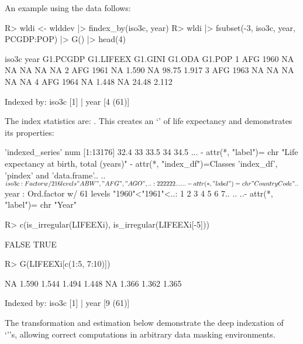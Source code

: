 \documentclass[article]{jss}
\newcommand{\class}[1]{`\code{#1}'}
\begin{document}
%
An example using the  data follows:
\begin{Schunk}
\begin{Sinput}
R> wldi <- wlddev |> findex_by(iso3c, year)
R> wldi |> fsubset(-3, iso3c, year, PCGDP:POP) |> G() |> head(4)
\end{Sinput}
\begin{Soutput}
  iso3c year G1.PCGDP G1.LIFEEX G1.GINI G1.ODA G1.POP
1   AFG 1960       NA        NA      NA     NA     NA
2   AFG 1961       NA     1.590      NA  98.75  1.917
3   AFG 1963       NA        NA      NA     NA     NA
4   AFG 1964       NA     1.448      NA  24.48  2.112

Indexed by:  iso3c [1] | year [4 (61)] 
\end{Soutput}
\end{Schunk}
The index statistics are: . This creates an \class{indexes\_series} of life expectancy and demonstrates its properties:
\begin{Schunk}
\begin{Soutput}
 'indexed_series' num [1:13176] 32.4 33 33.5 34 34.5 ...
 - attr(*, "label")= chr "Life expectancy at birth, total (years)"
 - attr(*, "index_df")=Classes 'index_df', 'pindex' and 'data.frame'..
  ..$ iso3c: Factor w/ 216 levels "ABW","AFG","AGO",..: 2 2 2 2 2 2 ..
  .. ..- attr(*, "label")= chr "Country Code"
  ..$ year : Ord.factor w/ 61 levels "1960"<"1961"<..: 1 2 3 4 5 6 7..
  .. ..- attr(*, "label")= chr "Year"
\end{Soutput}
\begin{Sinput}
R> c(is_irregular(LIFEEXi), is_irregular(LIFEEXi[-5]))
\end{Sinput}
\begin{Soutput}
[1] FALSE  TRUE
\end{Soutput}
\begin{Sinput}
R> G(LIFEEXi[c(1:5, 7:10)])
\end{Sinput}
\begin{Soutput}
[1]    NA 1.590 1.544 1.494 1.448    NA 1.366 1.362 1.365

Indexed by:  iso3c [1] | year [9 (61)] 
\end{Soutput}
\end{Schunk}
The transformation and estimation below demonstrate the deep indexation of \\ \class{indexed\_frame}'s, allowing correct computations in arbitrary data masking environments.
\end{document}

